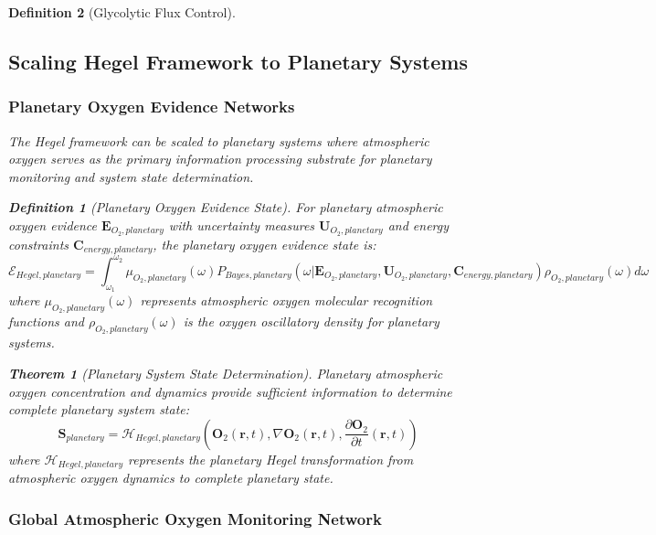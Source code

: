 \documentclass[12pt,a4paper]{article}
\newtheorem{theorem}{Theorem}
\newtheorem{definition}{Definition}
\begin{document}
\begin{definition}[Glycolytic Flux Control]
\subsection{Scaling Hegel Framework to Planetary Systems}

\subsubsection{Planetary Oxygen Evidence Networks}

The Hegel framework can be scaled to planetary systems where atmospheric oxygen serves as the primary information processing substrate for planetary monitoring and system state determination.

\begin{definition}[Planetary Oxygen Evidence State]
For planetary atmospheric oxygen evidence $\mathbf{E}_{O_2,planetary}$ with uncertainty measures $\mathbf{U}_{O_2,planetary}$ and energy constraints $\mathbf{C}_{energy,planetary}$, the planetary oxygen evidence state is:
\begin{equation}
\mathcal{E}_{Hegel,planetary} = \int_{\omega_1}^{\omega_2} \mu_{O_2,planetary}(\omega) P_{Bayes,planetary}(\omega | \mathbf{E}_{O_2,planetary}, \mathbf{U}_{O_2,planetary}, \mathbf{C}_{energy,planetary}) \rho_{O_2,planetary}(\omega) d\omega
\end{equation}
where $\mu_{O_2,planetary}(\omega)$ represents atmospheric oxygen molecular recognition functions and $\rho_{O_2,planetary}(\omega)$ is the oxygen oscillatory density for planetary systems.
\end{definition}

\begin{theorem}[Planetary System State Determination]
Planetary atmospheric oxygen concentration and dynamics provide sufficient information to determine complete planetary system state:
\begin{equation}
\mathbf{S}_{planetary} = \mathcal{H}_{Hegel,planetary}(\mathbf{O}_2(\mathbf{r}, t), \nabla \mathbf{O}_2(\mathbf{r}, t), \frac{\partial \mathbf{O}_2}{\partial t}(\mathbf{r}, t))
\end{equation}
where $\mathcal{H}_{Hegel,planetary}$ represents the planetary Hegel transformation from atmospheric oxygen dynamics to complete planetary state.
\end{theorem}

\subsubsection{Global Atmospheric Oxygen Monitoring Network}


\end{definition}
\end{document}
